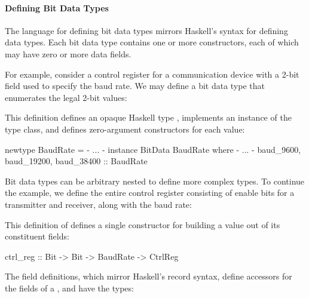 \paragraph{Defining Bit Data Types}
The language for defining bit data types mirrors Haskell's syntax
for defining data types. Each bit data type contains one or more
constructors, each of which may have zero or more data fields.

For example, consider a control register for a communication device
with a 2-bit field used to specify the baud rate. We may define a
bit data type  that enumerates the legal 2-bit values:

\begin{code}
[ivory|
  bitdata BaudRate :: Bits 2
    = baud_9600   as 0b00
    | baud_19200  as 0b01
    | baud_38400  as 0b10
    -- bit pattern 0b11 is invalid
|]
\end{code}

This definition defines an opaque Haskell type ,
implements an instance of the  type class, and defines
zero-argument constructors for each value:

\begin{code}
newtype BaudRate = {- ... -}
instance BitData BaudRate where
  {- ... -}
baud_9600, baud_19200, baud_38400 :: BaudRate
\end{code}

Bit data types can be arbitrary nested to define more complex types.
To continue the example, we define the entire control register consisting
of enable bits for a transmitter and receiver, along with the baud rate:

\begin{code}
[ivory|
  bitdata CtrlReg :: Bits 8 = ctrl_reg
    { ctrl_tx_enable  :: Bit
    , ctrl_rx_enable  :: Bit
    , ctrl_baud_rate  :: BaudRate
    } as 0b0000 # ctrl_tx_enable # ctrl_rx_enable
                # ctrl_baud_rate
|]
\end{code}

This definition of  defines a single constructor for building
a  value out of its constituent fields:

\begin{code}
ctrl_reg :: Bit -> Bit -> BaudRate -> CtrlReg
\end{code}

The field definitions, which mirror Haskell's record syntax, 
define accessors for the fields of a ,
and have the types:

